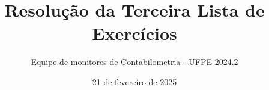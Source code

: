 \documentclass[brazilian,a4paper,article,12pt]{memoir}
\title{Resolução da Terceira Lista de Exercícios}
\author{Equipe de monitores de Contabilometria - UFPE 2024.2}
\date{21 de fevereiro de 2025}
\begin{document}
\frontmatter
\begin{titlingpage}
\maketitle
\end{titlingpage}

\setlrmarginsandblock{3cm}{2cm}{*}
\setulmarginsandblock{3cm}{2cm}{*}
\checkandfixthelayout

\mainmatter

\end{document}
